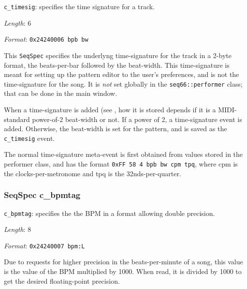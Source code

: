
   \begin{description}
      \item \texttt{c\_timesig}: specifies the time signature for a track.
      \item \textsl{Length}: 6
      \item \textsl{Format}: \texttt{0x24240006 bpb bw}
   \end{description}

   This \texttt{SeqSpec} specifies the underlyng
   time-signature for the track in a 2-byte
   format, the beats-per-bar followed by the beat-width.
   This time-signature is meant for setting up the pattern editor to the
   user's preferences, and is not the time-signature for the song.
   It is \textsl{not} set globally in the \texttt{seq66::performer} class;
   that can be done in the main window.

   When a time-signature is added
   (see ,
   how it is stored depends if it is a MIDI-standard power-of-2 beat-width or
   not.  If a power of 2, a time-signature event is added.
   Otherwise, the beat-width is set for the pattern, and is saved as the
   \texttt{c\_timesig} event.

   The normal time-signature meta-event is first obtained from values stored in
   the performer class, and has the format
   \texttt{0xFF 58 4 bpb bw cpm tpq}, where cpm is the clocks-per-metronome
   and tpq is the 32nds-per-quarter.

\subsubsection{SeqSpec c\_bpmtag}
\label{subsubsec:midi_format_track_seqspec_bpmtag}


   \begin{description}
      \item \texttt{c\_bpmtag}: specifies the the BPM in a format allowing double
         precision.
      \item \textsl{Length}: 8
      \item \textsl{Format}: \texttt{0x24240007 bpm:L}
   \end{description}

   Due to requests for higher precision in the beats-per-minute of a song, this
   value is the value of the BPM multiplied by 1000.
   When read, it is divided by 1000 to get the desired floating-point precision.

